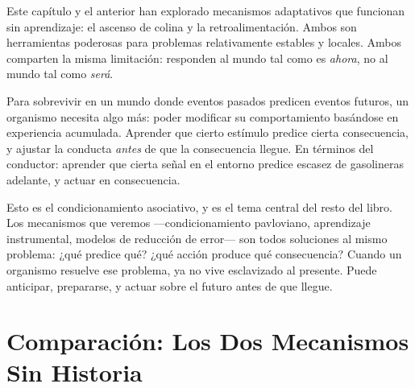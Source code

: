 \documentclass[
  letterpaper,
  DIV=11,
  numbers=noendperiod]{scrreprt}
\begin{document}
\begin{tcolorbox}[enhanced jigsaw, arc=.35mm, bottomrule=.15mm, breakable, colback=white, colframe=quarto-callout-note-color-frame, left=2mm, leftrule=.75mm, opacityback=0, rightrule=.15mm, toprule=.15mm]
Este capítulo y el anterior han explorado mecanismos adaptativos que
funcionan sin aprendizaje: el ascenso de colina y la retroalimentación.
Ambos son herramientas poderosas para problemas relativamente estables y
locales. Ambos comparten la misma limitación: responden al mundo tal
como es \emph{ahora}, no al mundo tal como \emph{será}.

Para sobrevivir en un mundo donde eventos pasados predicen eventos
futuros, un organismo necesita algo más: poder modificar su
comportamiento basándose en experiencia acumulada. Aprender que cierto
estímulo predice cierta consecuencia, y ajustar la conducta \emph{antes}
de que la consecuencia llegue. En términos del conductor: aprender que
cierta señal en el entorno predice escasez de gasolineras adelante, y
actuar en consecuencia.

Esto es el condicionamiento asociativo, y es el tema central del resto
del libro. Los mecanismos que veremos ---condicionamiento pavloviano,
aprendizaje instrumental, modelos de reducción de error--- son todos
soluciones al mismo problema: ¿qué predice qué? ¿qué acción produce qué
consecuencia? Cuando un organismo resuelve ese problema, ya no vive
esclavizado al presente. Puede anticipar, prepararse, y actuar sobre el
futuro antes de que llegue.

\section{Comparación: Los Dos Mecanismos Sin
Historia}\label{comparaciuxf3n-los-dos-mecanismos-sin-historia}


\end{tcolorbox}
\end{document}
